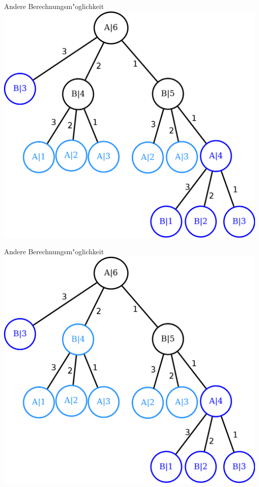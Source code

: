 \documentclass[18pt]{beamer}
\begin{document}
\begin{frame}{Andere Berechnungsm"oglichkeit}
\includegraphics[scale=0.55]{baum15.png}
\end{frame}

\begin{frame}{Andere Berechnungsm"oglichkeit}
\includegraphics[scale=0.55]{baum16.png}
\end{frame}
\end{document}
